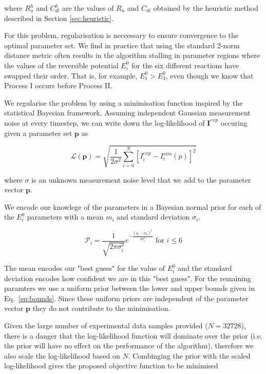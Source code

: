 \documentclass[a4paper, 12pt]{article}
\begin{document}
\noindent where $R_u^h$ and $C_{dl}^h$ are the values of $R_u$ and $C_{dl}$ obtained by the 
heuristic method described in Section \ref{sec:heuristic}.

For this problem, regularisation is neccessary to ensure
convergence to the optimal parameter set. We find in practice that using the
standard 2-norm distance metric often results in the algorithm stalling in
parameter regions where the values of the reversible potential $E^0_i$ for the six
different reactions have swapped their order. That is, for example, $E^0_1 >
E^0_3$, even though we know that Process I occurs before Process II. 

We regularise the problem by using a minimisation function inspired by the
statistical Bayesian framework. Assuming independent Gaussian measurement noise
at every timestep, we can write down the log-likelihood of $\mathbf{I}^{exp}$
occuring given a parameter set $\mathbf{p}$ as

\begin{equation}
    \mathcal{L}(\mathbf{p}) = \sqrt{\frac{1}{2 \sigma^2} \sum_{i=0}^{N} [I^{exp}_i-I^{sim}_i(p)]^2}
\end{equation}

where $\sigma$ is an unknown measurement noise level that we add to the
parameter vector $\mathbf{p}$.

We encode our knowlege of the parameters in a Bayesian normal prior for each of
the $E^0_i$ parameters with a mean $m_i$ and standard deviation $\sigma_i$. 

\begin{equation}
    \mathcal{P}_i = \frac{1}{\sqrt{2 \pi \sigma_i^2}} e^{-\frac{(p_i-m_i)^2}{2 \sigma_i^2}} \text{      for } i \le 6
\end{equation}

The mean encodes our "best guess" for the value of $E^0_i$ and the standard
deviation encodes how confident we are in this "best guess". For the remaining
paramters we use a uniform prior between the lower and upper bounds given in
Eq.~\ref{eq:bounds}. Since these uniform priors are independent of the parameter vector $\mathbf{p}$ they do not contribute to the minimisation. 

Given the large number of experimental data samples provided ($N = 32728$), there
is a danger that the log-likelihood function will dominate over the prior (i.e.
the prior will have no effect on the performance of the algorithm), therefore we
also scale the log-likelihood based on $N$. Combinging the prior with the scaled
log-likelihood gives the proposed objective function to be minimised
\end{document}
